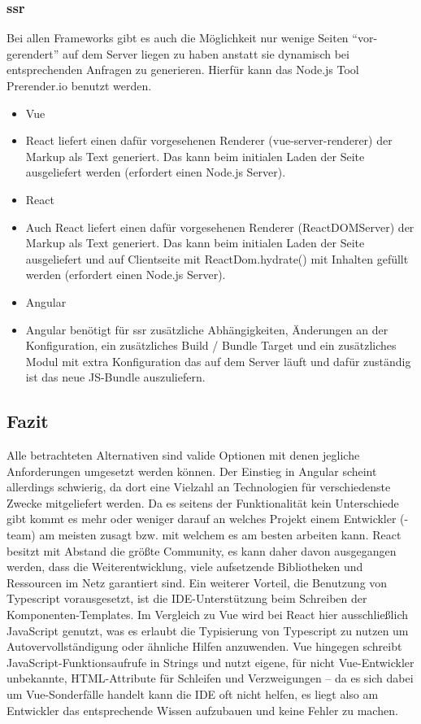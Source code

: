 \subsubsection{\acrlong{ssr}}
Bei allen Frameworks gibt es auch die Möglichkeit nur wenige Seiten ``vor-gerendert'' auf dem Server liegen zu haben anstatt sie dynamisch bei entsprechenden Anfragen zu generieren. Hierfür kann das Node.js Tool Prerender.io benutzt werden.
\begin{itemize}
    \item{Vue}
    \item[] React liefert einen dafür vorgesehenen Renderer (vue-server-renderer) der Markup als Text generiert. Das kann beim initialen Laden der Seite ausgeliefert werden (erfordert einen Node.js Server).
    \item{React}
    \item[] Auch React liefert einen dafür vorgesehenen Renderer (ReactDOMServer) der Markup als Text generiert. Das kann beim initialen Laden der Seite ausgeliefert und auf Clientseite mit ReactDom.hydrate() mit Inhalten gefüllt werden (erfordert einen Node.js Server).
    \item{Angular}
    \item[] Angular benötigt für \gls{ssr} zusätzliche Abhängigkeiten, Änderungen an der Konfiguration, ein zusätzliches Build / Bundle Target und ein zusätzliches Modul mit extra Konfiguration das auf dem Server läuft und dafür zuständig ist das neue JS-Bundle auszuliefern.
\end{itemize}

\subsection{Fazit}
Alle betrachteten Alternativen sind valide Optionen mit denen jegliche Anforderungen umgesetzt werden können. Der Einstieg in Angular scheint allerdings schwierig, da dort eine Vielzahl an Technologien für verschiedenste Zwecke mitgeliefert werden. Da es seitens der Funktionalität kein Unterschiede gibt kommt es mehr oder weniger darauf an welches Projekt einem Entwickler (-team) am meisten zusagt bzw. mit welchem es am besten arbeiten kann.
React besitzt mit Abstand die größte Community, es kann daher davon ausgegangen werden, dass die Weiterentwicklung, viele aufsetzende Bibliotheken und Ressourcen im Netz garantiert sind. Ein weiterer Vorteil, die Benutzung von Typescript vorausgesetzt, ist die IDE-Unterstützung beim Schreiben der Komponenten-Templates. Im Vergleich zu Vue wird bei React hier ausschließlich JavaScript genutzt, was es erlaubt die Typisierung von Typescript zu nutzen um Autovervollständigung oder ähnliche Hilfen anzuwenden. Vue hingegen schreibt JavaScript-Funktionsaufrufe in Strings und nutzt eigene, für nicht Vue-Entwickler unbekannte, HTML-Attribute für Schleifen und Verzweigungen -- da es sich dabei um Vue-Sonderfälle handelt kann die IDE oft nicht helfen, es liegt also am Entwickler das entsprechende Wissen aufzubauen und keine Fehler zu machen.

